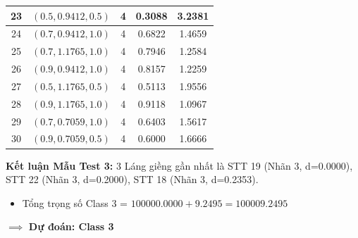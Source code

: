 \documentclass[12pt,a4paper]{article}
\begin{document}
\begin{table}[H]
\begin{tabular}{|c|c|c|c|c|}
23 & $(0.5, 0.9412, 0.5)$ & 4 & 0.3088 & 3.2381 \\ \hline
24 & $(0.7, 0.9412, 1.0)$ & 4 & 0.6822 & 1.4659 \\ \hline
25 & $(0.7, 1.1765, 1.0)$ & 4 & 0.7946 & 1.2584 \\ \hline
26 & $(0.9, 0.9412, 1.0)$ & 4 & 0.8157 & 1.2259 \\ \hline
27 & $(0.5, 1.1765, 0.5)$ & 4 & 0.5113 & 1.9556 \\ \hline
28 & $(0.9, 1.1765, 1.0)$ & 4 & 0.9118 & 1.0967 \\ \hline
29 & $(0.7, 0.7059, 1.0)$ & 4 & 0.6403 & 1.5617 \\ \hline
30 & $(0.9, 0.7059, 0.5)$ & 4 & 0.6000 & 1.6666 \\ \hline
\end{tabular}
\end{table}

\textbf{Kết luận Mẫu Test 3:} 3 Láng giềng gần nhất là STT 19 (Nhãn 3, d=0.0000), STT 22 (Nhãn 3, d=0.2000), STT 18 (Nhãn 3, d=0.2353).
\begin{itemize}
    \item Tổng trọng số Class 3 = $100000.0000 + 9.2495 = 100009.2495$
\end{itemize}
$\implies$ \textbf{Dự đoán: Class 3}
\end{document}
